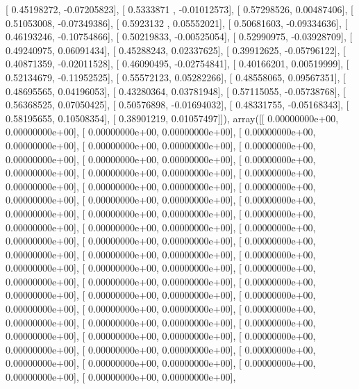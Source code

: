 \documentclass{article}
\begin{document}
       [ 0.45198272, -0.07205823],
       [ 0.5333871 , -0.01012573],
       [ 0.57298526,  0.00487406],
       [ 0.51053008, -0.07349386],
       [ 0.5923132 ,  0.05552021],
       [ 0.50681603, -0.09334636],
       [ 0.46193246, -0.10754866],
       [ 0.50219833, -0.00525054],
       [ 0.52990975, -0.03928709],
       [ 0.49240975,  0.06091434],
       [ 0.45288243,  0.02337625],
       [ 0.39912625, -0.05796122],
       [ 0.40871359, -0.02011528],
       [ 0.46090495, -0.02754841],
       [ 0.40166201,  0.00519999],
       [ 0.52134679, -0.11952525],
       [ 0.55572123,  0.05282266],
       [ 0.48558065,  0.09567351],
       [ 0.48695565,  0.04196053],
       [ 0.43280364,  0.03781948],
       [ 0.57115055, -0.05738768],
       [ 0.56368525,  0.07050425],
       [ 0.50576898, -0.01694032],
       [ 0.48331755, -0.05168343],
       [ 0.58195655,  0.10508354],
       [ 0.38901219,  0.01057497]]), array([[  0.00000000e+00,   0.00000000e+00],
       [  0.00000000e+00,   0.00000000e+00],
       [  0.00000000e+00,   0.00000000e+00],
       [  0.00000000e+00,   0.00000000e+00],
       [  0.00000000e+00,   0.00000000e+00],
       [  0.00000000e+00,   0.00000000e+00],
       [  0.00000000e+00,   0.00000000e+00],
       [  0.00000000e+00,   0.00000000e+00],
       [  0.00000000e+00,   0.00000000e+00],
       [  0.00000000e+00,   0.00000000e+00],
       [  0.00000000e+00,   0.00000000e+00],
       [  0.00000000e+00,   0.00000000e+00],
       [  0.00000000e+00,   0.00000000e+00],
       [  0.00000000e+00,   0.00000000e+00],
       [  0.00000000e+00,   0.00000000e+00],
       [  0.00000000e+00,   0.00000000e+00],
       [  0.00000000e+00,   0.00000000e+00],
       [  0.00000000e+00,   0.00000000e+00],
       [  0.00000000e+00,   0.00000000e+00],
       [  0.00000000e+00,   0.00000000e+00],
       [  0.00000000e+00,   0.00000000e+00],
       [  0.00000000e+00,   0.00000000e+00],
       [  0.00000000e+00,   0.00000000e+00],
       [  0.00000000e+00,   0.00000000e+00],
       [  0.00000000e+00,   0.00000000e+00],
       [  0.00000000e+00,   0.00000000e+00],
       [  0.00000000e+00,   0.00000000e+00],
       [  0.00000000e+00,   0.00000000e+00],
       [  0.00000000e+00,   0.00000000e+00],
       [  0.00000000e+00,   0.00000000e+00],
       [  0.00000000e+00,   0.00000000e+00],
       [  0.00000000e+00,   0.00000000e+00],
       [  0.00000000e+00,   0.00000000e+00],
       [  0.00000000e+00,   0.00000000e+00],
       [  0.00000000e+00,   0.00000000e+00],
       [  0.00000000e+00,   0.00000000e+00],
       [  0.00000000e+00,   0.00000000e+00],
       [  0.00000000e+00,   0.00000000e+00],
\end{document}
